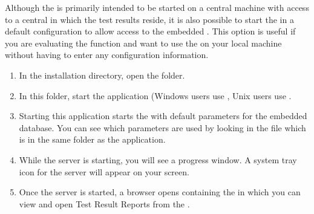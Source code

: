 Although the \dash{} is primarily intended to be started on a central machine with access to a central \gddb{} in which the test results reside, it is also possible to start the \dash{} in a default configuration to allow access to the embedded \gddb{}. This option is useful if you are evaluating the function and want to use the \dash{} on your local machine without having to enter any configuration information. 

\begin{enumerate}
\item In the installation directory, open the  folder. 
\item In this folder, start the  application (Windows users use , Unix users use .  
\item Starting this application starts the  with default parameters for the embedded database. You can see which parameters are used by looking in the  file which is in the same folder as the \dash{} application. 
\item While the server is starting, you will see a progress window. A system tray icon for the \dash{} server will appear on your screen. 
\item Once the server is started, a browser opens containing the \reportpersp{} in which you can view and open Test Result Reports from the \gddb{} . 
\end{enumerate}
